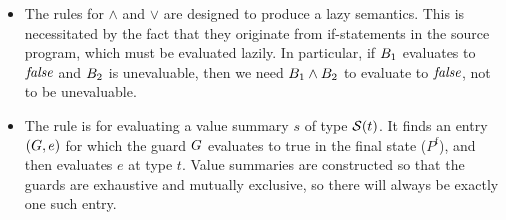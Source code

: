 {\begin{itemize}
\item The rules for $\land$ and $\lor$ are designed to produce a lazy
  semantics. This is necessitated by the fact that they originate from
  if-statements in the source program, which must be evaluated lazily.
  In particular, if $B_1$ evaluates to $\mathit{false}$ and $B_2$
  is unevaluable, then we need $B_1 \land B_2$ to evaluate to
  $\mathit{false}$, not to be unevaluable.

\item The  rule is for evaluating a value summary $s$ of
  type $\mathcal{S}(t)$. It finds an entry $(G,e)$ for which the guard
  $G$ evaluates to true in the final state ($P^{\mathrm{f}}$), and then
  evaluates $e$ at type $t$. Value summaries are constructed so that the guards
  are exhaustive and mutually exclusive, so there will always be exactly one
  such entry.

\end{itemize}





}
